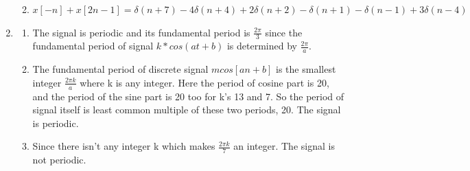 \documentclass[10pt,a4paper, margin=1in]{article}
\begin{document}
\begin{enumerate}
\begin{enumerate}
              \item %
              $x[-n] + x[2n-1] = \delta(n+7) - 4\delta(n + 4) + 2\delta(n + 2) - \delta(n + 1) - \delta(n - 1) + 3\delta(n - 4)$ 
          \end{enumerate}

    \item %
          \begin{enumerate}
              \item The signal is periodic and its fundamental period is $\frac{2 \pi}{3}$ since the fundamental
                    period of signal $k*cos(at+b)$ is determined by $\frac{2 \pi}{a}$.
              \item The fundamental period of discrete signal $mcos[an+b]$ is the smallest integer $\frac{2\pi k }{a}$ where k is any integer. Here the period of cosine part is 20, and the period of the sine part is 20 too for k's 13 and 7. So the period of signal itself is least common multiple of these two periods, 20. The signal is periodic.
              \item Since there isn't any integer k which makes $\frac{2\pi k}{7}$ an integer. The signal is not periodic.
          \end{enumerate}


\end{enumerate}
\end{document}

